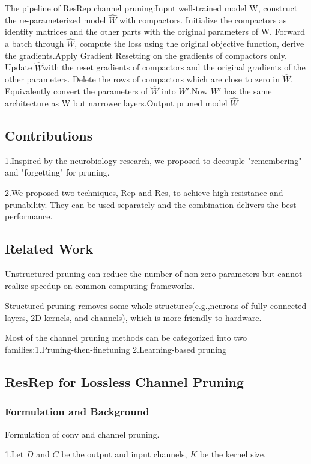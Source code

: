 \documentclass[11pt]{article}
\begin{document}
The pipeline of ResRep channel pruning:Input well-trained model W, construct the re-parameterized model $\hat{W}$ with compactors. Initialize the compactors as identity matrices and the other parts with the original parameters of W. Forward a batch through $\hat{W}$, compute the loss using the original objective function, derive the gradients.Apply Gradient Resetting on the gradients of compactors only. Update $\hat{W}$with the reset gradients of compactors and the original gradients of the other parameters. Delete the rows of compactors which are close to zero in $\hat{W}$. Equivalently convert the parameters of $\hat{W}$ into $W'$.Now $W'$ has the same architecture as W but narrower layers.Output pruned model $\hat{W}$

\subsection{Contributions}
1.Inspired by the neurobiology research, we proposed to decouple "remembering" and "forgetting" for pruning.

2.We proposed two techniques, Rep and Res, to achieve high resistance and prunability. They can be used separately and the combination delivers the best performance.

\subsection{Related Work}
Unstructured pruning can reduce the number of non-zero parameters but cannot realize speedup on common computing frameworks.

Structured pruning removes some whole structures(e.g.,neurons of fully-connected layers, 2D kernels, and channels), which is more friendly to hardware.

Most of the channel pruning methods can be categorized into two families:1.Pruning-then-finetuning 2.Learning-based pruning

\subsection{ResRep for Lossless Channel Pruning}
\subsubsection{Formulation and Background}
Formulation of conv and channel pruning.

\noindent1.Let $D$ and $C$ be the output and input channels, $K$ be the kernel size.
\end{document}
